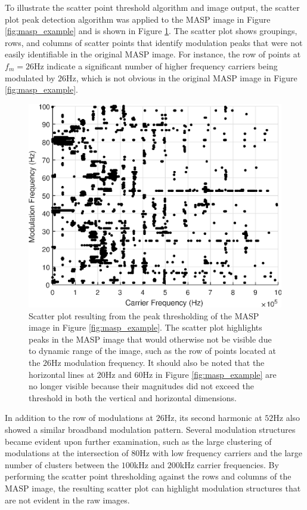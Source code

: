 To illustrate the scatter point threshold algorithm and image output, the scatter plot peak detection algorithm was applied to the MASP image in Figure \ref{fig:masp_example} and is shown in Figure \ref{fig:maspl_scatter}.  The scatter plot shows groupings, rows, and columns of scatter points that identify modulation peaks that were not easily identifiable in the original MASP image.  For instance, the row of points at $f_m = 26$Hz indicate a significant number of higher frequency carriers being modulated by $26$Hz, which is not obvious in the original MASP image in Figure \ref{fig:masp_example}.

\begin{figure}[tb]
	\includegraphics[width=\textwidth]{./dasp_algorithm_results/masp_low_scatter_filenum_12001.eps}
	\centering
	\caption{Scatter plot resulting from the peak thresholding of the MASP image in Figure \ref{fig:masp_example}.  The scatter plot highlights peaks in the MASP image that would otherwise not be visible due to dynamic range of the image, such as the row of points located at the $26$Hz modulation frequency.  It should also be noted that the horizontal lines at $20$Hz and $60$Hz in Figure \ref{fig:masp_example} are no longer visible because their magnitudes did not exceed the threshold in both the vertical and horizontal dimensions.}
	\label{fig:maspl_scatter}
\end{figure}

In addition to the row of modulations at $26$Hz, its second harmonic at $52$Hz also showed a similar broadband modulation pattern.  Several modulation structures became evident upon further examination, such as the large clustering of modulations at the intersection of $80$Hz with low frequency carriers and the large number of clusters between the $100$kHz and $200$kHz carrier frequencies.  By performing the scatter point thresholding against the rows and columns of the MASP image, the resulting scatter plot can highlight modulation structures that are not evident in the raw images.   

